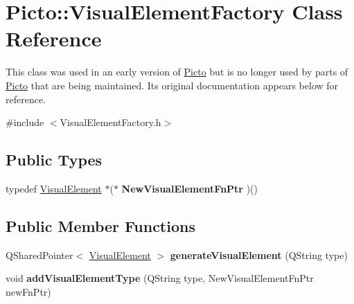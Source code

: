 \hypertarget{class_picto_1_1_visual_element_factory}{\section{Picto\-:\-:Visual\-Element\-Factory Class Reference}
\label{class_picto_1_1_visual_element_factory}
}


This class was used in an early version of \hyperlink{namespace_picto}{Picto} but is no longer used by parts of \hyperlink{namespace_picto}{Picto} that are being maintained. Its original documentation appears below for reference.  




{\ttfamily \#include $<$Visual\-Element\-Factory.\-h$>$}

\subsection*{Public Types}
\begin{DoxyCompactItemize}
\item 
\hypertarget{class_picto_1_1_visual_element_factory_a3f037db01a3575960ac3240f39c48654}{typedef \hyperlink{struct_picto_1_1_visual_element}{Visual\-Element} $\ast$($\ast$ {\bfseries New\-Visual\-Element\-Fn\-Ptr} )()}\label{class_picto_1_1_visual_element_factory_a3f037db01a3575960ac3240f39c48654}

\end{DoxyCompactItemize}
\subsection*{Public Member Functions}
\begin{DoxyCompactItemize}
\item 
\hypertarget{class_picto_1_1_visual_element_factory_ada3be07d2b0ae72c9c52b36af5e70c2f}{Q\-Shared\-Pointer$<$ \hyperlink{struct_picto_1_1_visual_element}{Visual\-Element} $>$ {\bfseries generate\-Visual\-Element} (Q\-String type)}\label{class_picto_1_1_visual_element_factory_ada3be07d2b0ae72c9c52b36af5e70c2f}

\item 
\hypertarget{class_picto_1_1_visual_element_factory_a6b61581af7255d79962eeb947fb9e654}{void {\bfseries add\-Visual\-Element\-Type} (Q\-String type, New\-Visual\-Element\-Fn\-Ptr new\-Fn\-Ptr)}\label{class_picto_1_1_visual_element_factory_a6b61581af7255d79962eeb947fb9e654}

\end{DoxyCompactItemize}


